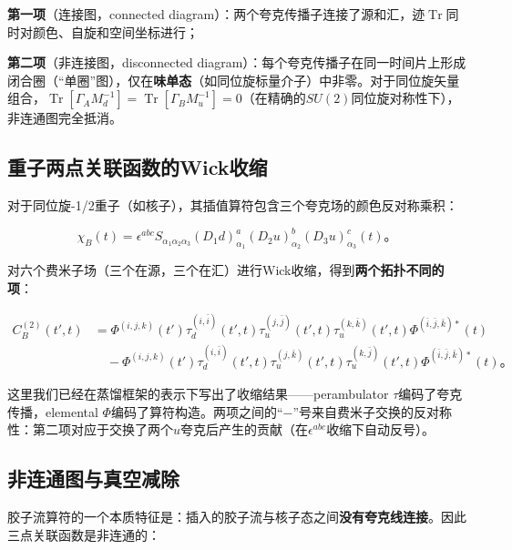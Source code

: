 \documentclass[12pt,a4paper]{ctexart}
\theoremstyle{definition}
\begin{document}
\textbf{第一项}（连接图，connected diagram）：两个夸克传播子连接了源和汇，迹$\operatorname{Tr}$同时对颜色、自旋和空间坐标进行；

\textbf{第二项}（非连接图，disconnected diagram）：每个夸克传播子在同一时间片上形成闭合圈（``单圈''图），仅在\textbf{味单态}（如同位旋标量介子）中非零。对于同位旋矢量组合，$\operatorname{Tr}[\Gamma_A M^{-1}_d] = \operatorname{Tr}[\Gamma_B M^{-1}_u] = 0$（在精确的$SU(2)$同位旋对称性下），非连通图完全抵消。

\subsection{重子两点关联函数的Wick收缩}

对于同位旋-1/2重子（如核子），其插值算符包含三个夸克场的颜色反对称乘积\cite{Peardon2009,NoteGluonPDFs}：

\begin{equation}
\chi_B(t) = \epsilon^{abc} S_{\alpha_1\alpha_2\alpha_3} (D_1 d)^a_{\alpha_1} (D_2 u)^b_{\alpha_2} (D_3 u)^c_{\alpha_3}(t)。
\label{eq:baryon_op}
\end{equation}

对六个费米子场（三个在源，三个在汇）进行Wick收缩，得到\textbf{两个拓扑不同的项}\cite{Peardon2009}：

\begin{equation}
\boxed{
\begin{aligned}
C^{(2)}_B(t', t) &= \Phi^{(i,j,k)}(t') \tau^{(i,\bar{i})}_d(t',t) \tau^{(j,\bar{j})}_u(t',t) \tau^{(k,\bar{k})}_u(t',t) \Phi^{(\bar{i},\bar{j},\bar{k})*}(t) \\
&\quad - \Phi^{(i,j,k)}(t') \tau^{(i,\bar{i})}_d(t',t) \tau^{(j,\bar{k})}_u(t',t) \tau^{(k,\bar{j})}_u(t',t) \Phi^{(\bar{i},\bar{j},\bar{k})*}(t)。
\end{aligned}}
\label{eq:baryon_wick}
\end{equation}

这里我们已经在蒸馏框架的表示下写出了收缩结果——perambulator $\tau$编码了夸克传播，elemental $\Phi$编码了算符构造。两项之间的``$-$''号来自费米子交换的反对称性：第二项对应于交换了两个$u$夸克后产生的贡献（在$\epsilon^{abc}$收缩下自动反号）。

\subsection{非连通图与真空减除}

胶子流算符的一个本质特征是：插入的胶子流与核子态之间\textbf{没有夸克线连接}。因此三点关联函数是非连通的\cite{Chen2025gluon,NoteGluonPDFs}：
\end{document}
